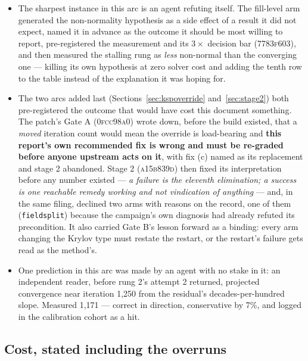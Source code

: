 \documentclass[11pt,a4paper]{article}
\newcommand{\commit}[1]{\textsc{\small #1}}
\begin{document}
\begin{itemize}
attempt with no theory behind it: that a convergence there would be a knob nobody could explain
and \emph{must not} be allowed to retro-justify the diagnosis. It stalled, so the clause was
never tested --- and it is recorded as having been in place beforehand regardless, which is the
only time such a clause can be worth anything.
\item The sharpest instance in this arc is an agent refuting itself. The fill-level arm
generated the non-normality hypothesis as a side effect of a result it did not expect, named it
in advance as the outcome it should be most willing to report, pre-registered the measurement
and its \(3\times\) decision bar (\commit{7783f603}), and then measured the stalling rung as
\emph{less} non-normal than the converging one --- killing its own hypothesis at zero solver
cost and adding the tenth row to the table instead of the explanation it was hoping for.
\item The two arcs added last (Sections~\ref{sec:kspoverride} and~\ref{sec:stage2}) both
pre-registered the outcome that would have cost this document something. The patch's Gate A
(\commit{0fcc98a0}) wrote down, before the build existed, that a \emph{moved} iteration count
would mean the override is load-bearing and \textbf{this report's own recommended fix is wrong
and must be re-graded before anyone upstream acts on it}, with fix (c) named as its replacement
and stage 2 abandoned. Stage 2 (\commit{a15b839d}) then fixed its interpretation before any
number existed --- \emph{a failure is the eleventh elimination; a success is one reachable remedy
working and not vindication of anything} --- and, in the same filing, declined two arms with
reasons on the record, one of them (\texttt{fieldsplit}) because the campaign's own diagnosis had
already refuted its precondition. It also carried Gate B's lesson forward as a binding: every
arm changing the Krylov type must restate the restart, or the restart's failure gets read as the
method's.
\item One prediction in this arc was made by an agent with no stake in it: an independent
reader, before rung 2's attempt 2 returned, projected convergence near iteration 1{,}250 from
the residual's decades-per-hundred slope. Measured 1{,}171 --- correct in direction, conservative
by 7\%, and logged in the calibration cohort as a hit.
\end{itemize}

\subsection{Cost, stated including the overruns}
\end{document}
